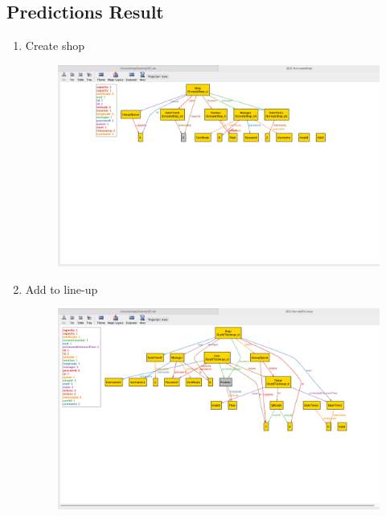 \subsection{Predictions Result}
\begin{enumerate}
	\item Create shop \\
	\begin{figure}[H]
		\centering
		\includegraphics[width=0.9\textheight,keepaspectratio, angle=90]{images/alloy_createShop.png}
	\end{figure}
	\clearpage

	\item Add to line-up \\
	\begin{figure}[H]
		\centering
		\includegraphics[width=0.9\textheight,keepaspectratio, angle=90]{images/alloy_addToLineup.png}
	\end{figure}
	\clearpage


\end{enumerate}
